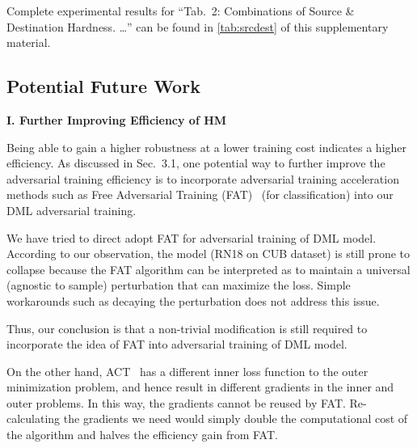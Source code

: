 

Complete experimental results for ``Tab.~2: Combinations of Source \&
Destination Hardness. \ldots'' can be found in \cref{tab:srcdest} of this
supplementary material.

\subsection{Potential Future Work}

\noindent\textbf{I. Further Improving Efficiency of HM}

Being able to gain a higher robustness at a lower training cost indicates a
higher efficiency.
%
As discussed in Sec.~3.1, one potential way to further improve the adversarial
training efficiency is to incorporate adversarial training acceleration methods
such as Free Adversarial Training (FAT)~\cite{freeat} (for classification) into
our DML adversarial training.

We have tried to direct adopt FAT for adversarial training of DML model.
%
According to our observation, the model (RN18 on CUB dataset) is still prone
to collapse because the FAT algorithm can be interpreted as to maintain
a universal (agnostic to sample) perturbation that can maximize the loss.
%
Simple workarounds such as decaying the perturbation does not address this
issue.

Thus, our conclusion is that a non-trivial modification is still required
to incorporate the idea of FAT into adversarial training of DML model.

On the other hand, ACT~\cite{robrank} has a different inner loss function to
the outer minimization problem, and hence result in different gradients in the
inner and outer problems.
%
In this way, the gradients cannot be reused by FAT.
%
Re-calculating the gradients we need would simply double the
computational cost of the algorithm and halves the efficiency gain from FAT.

\begin{comment}
FAT works on toy dataset only for adversarial DML.

Further experiments suggest very weak robustness and the
models are very prone to collapse due to the non-zero initial delta
(results in too hard adversarial example).

Gradient approximation does not work. Triplet gradient and ACT
gradient are convertible.

Does the new generic HM work under FAT?
	Previous FAT leads to collapse because (even if in the amdsemi +fat
	experiment due to implementation issue) the delta is going to be universal
	so that for every input $x$ it will increase $H[L(x)]$ as much as possible.
	This is too prone to lead to collpase. Can we reuse the gradient for 
	Hardness Manipulation then? We linearly scale down the delta?
	We want to minimize $E[|H_{src}(x)-H_{dst}(x)|]$ (to a specified hardness).
\end{comment}

